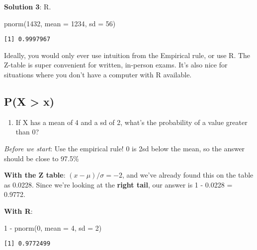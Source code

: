 \documentclass[
  letterpaper,
  DIV=11,
  numbers=noendperiod]{scrreprt}
\newenvironment{Shaded}{\begin{snugshade}}{\end{snugshade}}
\newcommand{\AttributeTok}[1]{\textcolor[rgb]{0.40,0.45,0.13}{#1}}
\newcommand{\DecValTok}[1]{\textcolor[rgb]{0.68,0.00,0.00}{#1}}
\newcommand{\FunctionTok}[1]{\textcolor[rgb]{0.28,0.35,0.67}{#1}}
\newcommand{\NormalTok}[1]{\textcolor[rgb]{0.00,0.23,0.31}{#1}}
\newcommand{\SpecialCharTok}[1]{\textcolor[rgb]{0.37,0.37,0.37}{#1}}
\providecommand{\tightlist}{%
  \setlength{\itemsep}{0pt}\setlength{\parskip}{0pt}}\usepackage{longtable,booktabs,array}
\begin{document}
\textbf{Solution 3}: R.

\begin{Shaded}
\begin{Highlighting}[]
\FunctionTok{pnorm}\NormalTok{(}\DecValTok{1432}\NormalTok{, }\AttributeTok{mean =} \DecValTok{1234}\NormalTok{, }\AttributeTok{sd =} \DecValTok{56}\NormalTok{)}
\end{Highlighting}
\end{Shaded}

\begin{verbatim}
[1] 0.9997967
\end{verbatim}

Ideally, you would only ever use intuition from the Empirical rule, or
use R. The Z-table is super convenient for written, in-person exams.
It's also nice for situations where you don't have a computer with R
available.

\hypertarget{px-x}{%
\subsection{P(X \textgreater{} x)}\label{px-x}}

\begin{enumerate}
\def\labelenumi{\arabic{enumi}.}
\setcounter{enumi}{2}
\tightlist
\item
  If X has a mean of 4 and a sd of 2, what's the probability of a value
  greater than 0?
\end{enumerate}

\emph{Before we start}: Use the empirical rule! 0 is 2sd below the mean,
so the answer should be close to 97.5\%

\textbf{With the Z table}: \((x-\mu)/\sigma = -2\), and we've already
found this on the table as 0.0228. Since we're looking at the
\textbf{right tail}, our answer is 1 - 0.0228 = 0.9772.

\textbf{With R}:

\begin{Shaded}
\begin{Highlighting}[]
\DecValTok{1} \SpecialCharTok{{-}} \FunctionTok{pnorm}\NormalTok{(}\DecValTok{0}\NormalTok{, }\AttributeTok{mean =} \DecValTok{4}\NormalTok{, }\AttributeTok{sd =} \DecValTok{2}\NormalTok{)}
\end{Highlighting}
\end{Shaded}

\begin{verbatim}
[1] 0.9772499
\end{verbatim}
\end{document}
